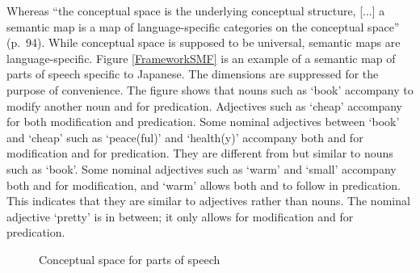 Whereas
``the conceptual space is the underlying conceptual structure,
[...] a semantic map is a map of language-specific categories on the conceptual space'' (p.\ 94).
While conceptual space is supposed to be universal,
semantic maps are language-specific.
Figure \ref{FrameworkSMF} is an example of a semantic map of parts of speech specific to Japanese.
The dimensions are suppressed for the purpose of convenience.
The figure shows that
nouns such as  `book' accompany  to modify another noun and  for predication. %
Adjectives such as  `cheap' accompany  for both modification and predication. %
Some nominal adjectives between `book' and `cheap' such as  `peace(ful)' and  `health(y)' accompany both  and  for modification and  for predication.
They are different from but similar to nouns such as `book'.
Some nominal adjectives such as  `warm' and  `small' accompany both  and  for modification, and
`warm' allows both  and  to follow in predication.
This indicates that
they are similar to adjectives rather than nouns.
The nominal adjective  `pretty' is in between;
it only allows  for modification and  for predication.

\begin{figure}
 \caption{Conceptual space for parts of speech \cite[92]{croft01}}
 \label{FrameworkCSF}
\end{figure}

